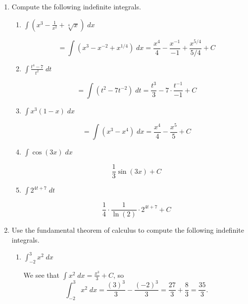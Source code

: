 \documentclass[11pt]{article}
\begin{document}
\drawtitle

\begin{enumerate}
  
\item Compute the following indefinite integrals.
  \begin{enumerate}
  \item $\displaystyle\int \left( x^3 - \frac{1}{x^2} +
      \sqrt[4]{x}\right)\;dx$
    \vfill
    {\color{blue}

      \[
      = \int \left( x^3 - x^{-2} + x^{1/4}\right)\;dx = \frac{x^4}{4}
      - \frac{x^{-1}}{-1} + \frac{x^{5/4}}{5/4} + C
      \]

    }
    \vfill
  \item $\displaystyle\int \frac{t^4-7}{t^2}\;dt$
    \vfill
    {\color{blue}

      \[
      =\int \left(t^2 - 7t^{-2}\right)\; dt = \frac{t^3}{3} -
      7\cdot\frac{t^{-1}}{-1} + C
      \]

    }
    \vfill
  \item $\displaystyle\int x^3\left( 1 - x\right)\;dx$
    \vfill
    {\color{blue}

      \[
      =\int\left(x^3-x^4\right)\; dx = \frac{x^4}{4} - \frac{x^5}{5} + C
      \]

    }
    \vfill

    \newpage

  \item $\displaystyle\int \cos(3x)\;dx$
    \vfill
    {\color{blue}

      \[
      \frac{1}{3}\sin(3x) + C
      \]

    }
    \vfill

  \item $\displaystyle\int 2^{4t+7}\;dt$
    \vfill
    {\color{blue}

      \[
      \frac{1}{4}\cdot\frac{1}{\ln(2)}\cdot 2^{4t+7} + C
      \]

    }
    \vfill
  \end{enumerate}
  
  \newpage

\item Use the fundamental theorem of calculus to compute the following
  indefinite integrals.
  \begin{enumerate}
  \item $\displaystyle\int_{-2}^3 x^2\;dx$
    \vfill
    {\color{blue}

      We see that $\int x^2\; dx = \frac{x^3}{3} + C$, so  
      \[
      \int_{-2}^3 x^2\;dx = \frac{(3)^3}{3} - \frac{(-2)^3}{3} =
      \frac{27}{3} + \frac{8}{3} = \frac{35}{3}.
      \]

}
\end{enumerate}
\end{enumerate}
\end{document}
